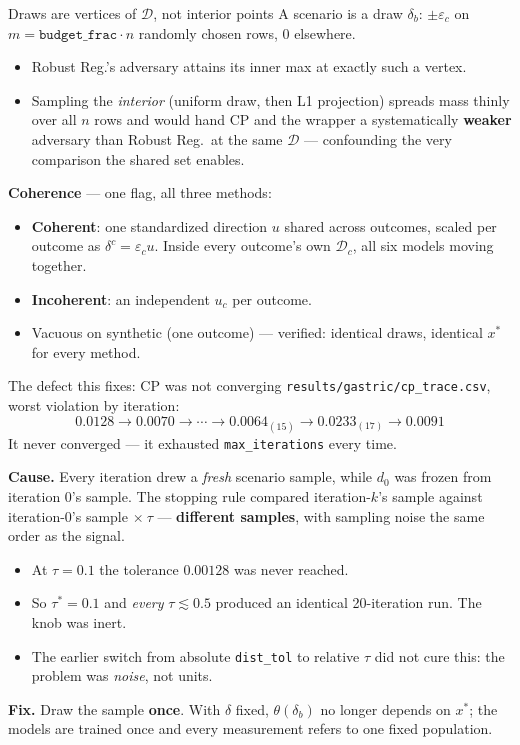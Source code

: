 \documentclass{beamer}
\begin{document}
\begin{frame}{Draws are vertices of $\mathcal D$, not interior points}
  \small
  A scenario is a draw $\delta_b$: $\pm\varepsilon_c$ on $m=\texttt{budget\_frac}\cdot n$
  randomly chosen rows, $0$ elsewhere.
  \begin{itemize}
    \item Robust Reg.'s adversary attains its inner max at exactly such a vertex.
    \item Sampling the \emph{interior} (uniform draw, then L1 projection) spreads
      mass thinly over all $n$ rows and would hand CP and the wrapper a
      systematically \textbf{weaker} adversary than Robust Reg.\ at the same
      $\mathcal D$ --- confounding the very comparison the shared set enables.
  \end{itemize}
  \medskip
  \textbf{Coherence} --- one flag, all three methods:
  \begin{itemize}
    \item \textbf{Coherent}: one standardized direction $u$ shared across outcomes,
      scaled per outcome as $\delta^c=\varepsilon_c u$. Inside every outcome's own
      $\mathcal D_c$, all six models moving together.
    \item \textbf{Incoherent}: an independent $u_c$ per outcome.
    \item Vacuous on synthetic (one outcome) --- verified: identical draws,
      identical $x^\ast$ for every method.
  \end{itemize}
\end{frame}

\begin{frame}{The defect this fixes: CP was not converging}
  \small
  \texttt{results/gastric/cp\_trace.csv}, worst violation by iteration:
  \[
    0.0128 \to 0.0070 \to \cdots \to 0.0064_{(15)} \to 0.0233_{(17)} \to 0.0091
  \]
  It never converged --- it exhausted \texttt{max\_iterations} every time.
  \medskip

  \textbf{Cause.} Every iteration drew a \emph{fresh} scenario sample, while $d_0$
  was frozen from iteration 0's sample. The stopping rule compared iteration-$k$'s
  sample against iteration-0's sample $\times\ \tau$ --- \textbf{different samples},
  with sampling noise the same order as the signal.
  \begin{itemize}
    \item At $\tau=0.1$ the tolerance $0.00128$ was never reached.
    \item So $\tau^\ast=0.1$ and \emph{every} $\tau\lesssim0.5$ produced an
      identical 20-iteration run. The knob was inert.
    \item The earlier switch from absolute \texttt{dist\_tol} to relative $\tau$
      did not cure this: the problem was \emph{noise}, not units.
  \end{itemize}
  \medskip
  \textbf{Fix.} Draw the sample \textbf{once}. With $\delta$ fixed,
  $\theta(\delta_b)$ no longer depends on $x^\ast$; the models are trained once and
  every measurement refers to one fixed population.
\end{frame}
\end{document}

